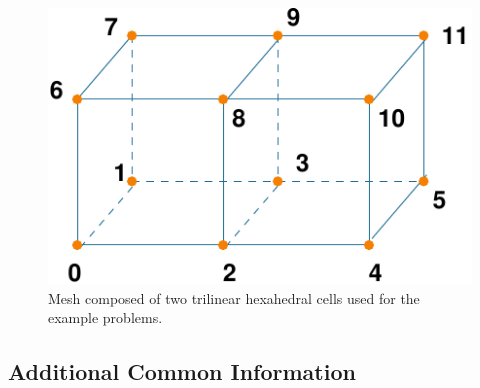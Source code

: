 \noindent \begin{center}
\begin{figure}
\begin{centering}
\includegraphics{tutorials/twocells/figs/twohex8-mesh}
\par\end{centering}

\caption{Mesh composed of two trilinear hexahedral cells used for the example
problems.\label{fig:twohex8-mesh}}
\end{figure}

\par\end{center}


\subsection{Additional Common Information}

